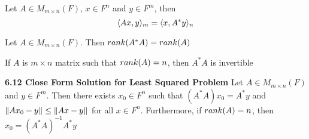 \documentclass[11pt]{article}
\begin{document}
\begin{lemma*}
    Let $A\in M_{m\times n}(F)$, $x\in F^n$ and $y\in F^m$, then 
    \[
        \langle Ax,y\rangle_m = \langle x,A^*y\rangle_n    
    \]
\end{lemma*}

\begin{lemma*}
    Let $A\in M_{m\times n}(F)$. Then $rank(A^*A)=rank(A)$
\end{lemma*}

\begin{corollary*}
    If $A$ is $m\times n$ matrix such that $rank(A)=n$, then $A^*A$ is invertible
\end{corollary*}


\begin{theorem*}
    \textbf{6.12 Close Form Solution for Least Squared Problem} Let $A\in M_{m\times n}(F)$ and $y\in F^m$. Then there exists $x_0\in F^n$ such that $(A^*A)x_0 = A^*y$ and $\left\lVert Ax_0 - y\right\rVert \leq \left\lVert Ax -y\right\rVert$ for all $x\in F^n$. Furthermore, if $rank(A)=n$, then $x_0 = (A^*A)^{-1}A^*y$ 
\end{theorem*}
\end{document}
